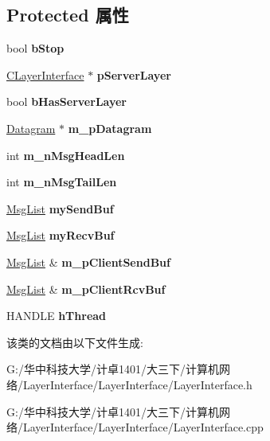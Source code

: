 \subsection*{Protected 属性}
\begin{DoxyCompactItemize}
\item 
\mbox{\label{class_c_layer_interface_a21292dad42f0048a08a19eeeba0d68cc}} 
bool {\bfseries b\+Stop}
\item 
\mbox{\label{class_c_layer_interface_a075d83e440db42925a85d17f9e3e9a0b}} 
\hyperlink{class_c_layer_interface}{C\+Layer\+Interface} $\ast$ {\bfseries p\+Server\+Layer}
\item 
\mbox{\label{class_c_layer_interface_ab5e0e1580b714b045664a8051373b8f2}} 
bool {\bfseries b\+Has\+Server\+Layer}
\item 
\mbox{\label{class_c_layer_interface_a6c3c04e1123c94ff609dafbd2429dfee}} 
\hyperlink{class_datagram}{Datagram} $\ast$ {\bfseries m\+\_\+p\+Datagram}
\item 
\mbox{\label{class_c_layer_interface_a7057ebc9a57429562f4642b5e8586a52}} 
int {\bfseries m\+\_\+n\+Msg\+Head\+Len}
\item 
\mbox{\label{class_c_layer_interface_a6c9d5fd635c29705c2cb9bea7c5a68f5}} 
int {\bfseries m\+\_\+n\+Msg\+Tail\+Len}
\item 
\mbox{\label{class_c_layer_interface_ab85631c424f3a77311ca4532db18d8a6}} 
\hyperlink{class_msg_list}{Msg\+List} {\bfseries my\+Send\+Buf}
\item 
\mbox{\label{class_c_layer_interface_a6b35060c9d58ff2a0f394e1c54301ae8}} 
\hyperlink{class_msg_list}{Msg\+List} {\bfseries my\+Recv\+Buf}
\item 
\mbox{\label{class_c_layer_interface_a17da1d50a68115d810b8079f1c6e22d7}} 
\hyperlink{class_msg_list}{Msg\+List} \& {\bfseries m\+\_\+p\+Client\+Send\+Buf}
\item 
\mbox{\label{class_c_layer_interface_af9509b975b79a1c15a5a5523c03eeaaa}} 
\hyperlink{class_msg_list}{Msg\+List} \& {\bfseries m\+\_\+p\+Client\+Rcv\+Buf}
\item 
\mbox{\label{class_c_layer_interface_a91818359711b0f61e18347707a13ba31}} 
H\+A\+N\+D\+LE {\bfseries h\+Thread}
\end{DoxyCompactItemize}


该类的文档由以下文件生成\+:\begin{DoxyCompactItemize}
\item 
G\+:/华中科技大学/计卓1401/大三下/计算机网络/\+Layer\+Interface/\+Layer\+Interface/Layer\+Interface.\+h\item 
G\+:/华中科技大学/计卓1401/大三下/计算机网络/\+Layer\+Interface/\+Layer\+Interface/Layer\+Interface.\+cpp\end{DoxyCompactItemize}

